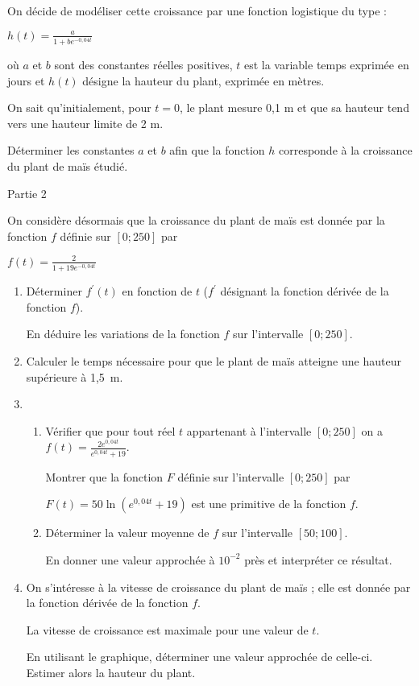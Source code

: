 On décide de modéliser cette croissance par une fonction logistique du type :
\par
$h\left(t\right)=	\frac{a}{1+be^{-0,04t}}$
\par
où $a$ et $b$ sont des constantes réelles positives, $t$ est la variable temps exprimée en jours et $h\left(t\right)$ désigne la hauteur du plant, exprimée en mètres.
\par
On sait qu'initialement, pour $t=0$, le plant mesure 0,1 m et que sa hauteur tend vers une hauteur limite de 2 m.
\par
Déterminer les constantes $a$ et $b$ afin que la fonction $h$ corresponde à la croissance du plant de maïs étudié.
\begin{h2}Partie 2\end{h2}
On considère désormais que la croissance du plant de maïs est donnée par la fonction $f$ définie sur $\left[0 ; 250\right]$ par
\par
$f\left(t\right)=\frac{2}{1+19e^{-0,04t}}$
\begin{enumerate}
     \item
     Déterminer $f^{\prime}\left(t\right)$ en fonction de $t$ ($f^{\prime}$ désignant la fonction dérivée de la fonction $f$).
     \par
     En déduire les variations de la fonction $f$ sur l'intervalle $\left[0 ; 250\right]$.
     \item
     Calculer le temps nécessaire pour que le plant de maïs atteigne une hauteur supérieure à 1,5 m.
     \item
     \begin{enumerate}[label=\alph*.]
          \item
          Vérifier que pour tout réel $t$ appartenant à l'intervalle $\left[0 ; 250\right]$ on a $f\left(t\right)=\frac{2e^{0,04t}}{e^{0,04t}+19}$.
          \par
          Montrer que la fonction $F$ définie sur l'intervalle $\left[0 ; 250\right]$ par
          \par
          $F\left(t\right)=50\ln \left(e^{0,04t}+19\right)$ est une primitive de la fonction $f$.
          \item
          Déterminer la valeur moyenne de $f$ sur l'intervalle $\left[50 ; 100\right]$.
          \par
          En donner une valeur approchée à $10^{-2}$ près et interpréter ce résultat.
     \end{enumerate}
     \item
     On s'intéresse à la vitesse de croissance du plant de maïs  ; elle est donnée par la fonction dérivée de la fonction $f$.
     \par
     La vitesse de croissance est maximale pour une valeur de $t$.
     \par
     En utilisant le graphique, déterminer une valeur approchée de celle-ci. Estimer alors la hauteur du plant.
\end{enumerate}
